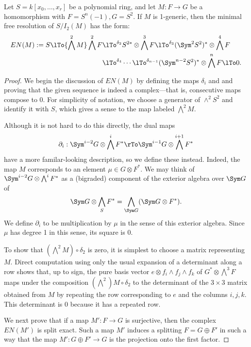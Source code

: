 \begin{theorem}\label{Eagon-Northcott}
 Let $S = k[x_0,\dots, x_r]$ be a polynomial ring,  and let $M: F\to G$ be a homomorphism with
 $F = S^n(-1), G= S^2$. If $M$ is 1-generic, then the minimal free resolution of $S/I_2(M)$ has the form:
\begin{align*}
EN(M) := 
S \lTo{\bigwedge^2 M} 
 \bigwedge^2 F&
 \lTo^{\delta_{2}}
 S^{2*}\otimes \bigwedge^3 F  \lTo^{\delta_{3}}
  (\Sym^2S^{2})^*\otimes\bigwedge^4F  \\
 &\lTo^{\delta_{4}}\cdots\lTo^{\delta_{n-1}} 
(\Sym^{n-2}S^{2})^*\otimes\bigwedge^nF 
 \lTo 0.
\end{align*}
\end{theorem}

\begin{proof} We begin the discussion of $EN(M)$ by defining the maps $\delta_i$ and and proving that the given sequence is indeed a complex---that is, consecutive maps compose to 0. For simplicity of notation, we choose a generator of $\wedge^2 S^2$
 and identify it with $S$, which gives a sense to the map labeled $\bigwedge^2M$.
 
  Although it is not hard to do this directly, the dual maps
 $$
 \partial_i: \Sym^{i-2} G \otimes \bigwedge^i F^* \rTo \Sym^{i-1} G \otimes \bigwedge^{i+1} F^*
 $$
 have a more familar-looking description, so we define these instead. Indeed, the map $M$ corresponds to an
 element $\mu\in G\otimes F^*$. We may think of $ \Sym^{i-2} G \otimes \bigwedge^i  F^*$
 as a (bigraded) component of the exterior algebra over $ \Sym G$ of 
 $$
  \Sym G \otimes \bigwedge_S  F^*= \bigwedge_{ \Sym G} (\Sym G \otimes  F^*).
 $$
We define $\partial_i$ to be  multiplication by $\mu$ in the sense of this exterior algebra. Since $\mu$ has degree 1
in this sense, its square is 0. 

To show that $(\bigwedge^2 M)\circ \delta_2$ is zero, it is simplest to choose a matrix representing $M$.
Direct computation using only the usual expansion of a determinant
along a row shows that, up to sign, the
pure basis vector $e\otimes f_i\wedge f_j\wedge f_k$ of $G^*\otimes \bigwedge^3 F$
maps under the composition $(\bigwedge^2) M\circ \delta_2$ to the determinant
of the $3\times 3$ matrix obtained from $M$ by repeating the row corresponding to $e$ and
the columns $i,j,k$. This determinant is 0 because it has a repeated row.

We next prove that if a map $M': F\to G$ is surjective, then the complex $EN(M')$
is split exact. Such a map $M'$ induces a splitting $F = G\oplus F'$ in such a way that the map $M': G\oplus F' \to G$ is the projection onto the first factor. 


\end{proof}
